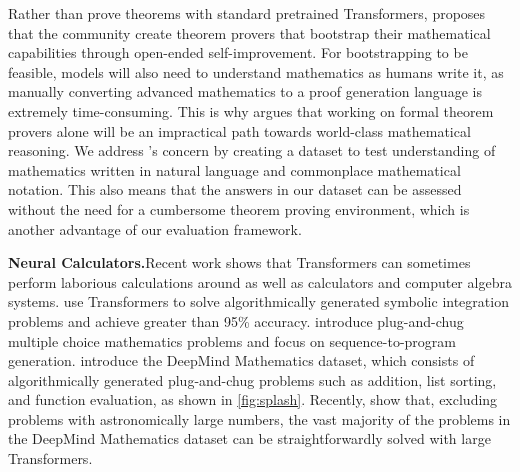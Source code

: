 Rather than prove theorems with standard pretrained Transformers, \citet{McAllester2020MathZeroTC} proposes that the community create theorem provers that bootstrap their mathematical capabilities through open-ended self-improvement. For bootstrapping to be feasible, models will also need to understand mathematics as humans write it, as manually converting advanced mathematics to a proof generation language is extremely time-consuming. This is why \citet{Szegedy2020APP} argues that working on formal theorem provers alone will be an impractical path towards world-class mathematical reasoning. We address \citet{Szegedy2020APP}'s concern by creating a dataset to test understanding of mathematics written in natural language and commonplace mathematical notation. This also means that the answers in our dataset can be assessed without the need for a cumbersome theorem proving environment, which is another advantage of our evaluation framework.

\textbf{Neural Calculators.}\quad Recent work shows that Transformers can sometimes perform laborious calculations around as well as calculators and computer algebra systems. \citet{Lample2020DeepLF} use Transformers to solve algorithmically generated symbolic integration problems and achieve greater than 95\% accuracy. \citet{Amini2019MathQATI,Ling2017ProgramIB} introduce plug-and-chug multiple choice mathematics problems and focus on sequence-to-program generation.
\citet{Saxton2019AnalysingMR} introduce the DeepMind Mathematics dataset, which consists of algorithmically generated plug-and-chug problems such as addition, list sorting, and function evaluation, as shown in \ref{fig:splash}. Recently, \citet{Henighan2020ScalingLF} show that, excluding problems with astronomically large numbers, the vast majority of the problems in the DeepMind Mathematics dataset can be straightforwardly solved with large Transformers.

